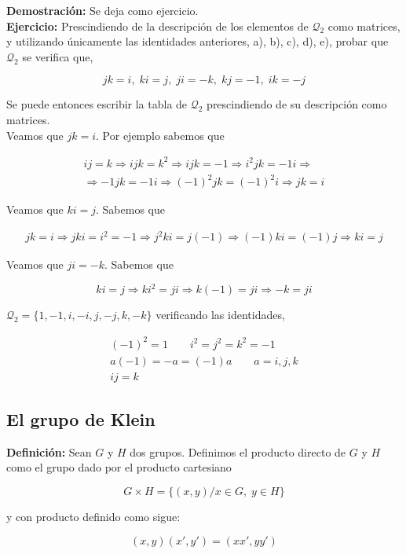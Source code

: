\documentclass{article}
\begin{document}
\textbf{Demostración:} Se deja como ejercicio. \\

\textbf{Ejercicio:} Prescindiendo de la descripción de los elementos de $\mathcal{Q}_2$ como matrices, y utilizando únicamente las identidades anteriores, a), b), c), d), e), probar que $\mathcal{Q}_2$ se verifica que,

\[
jk=i,\; ki=j,\; ji=-k,\; kj=-1,\; ik=-j
\]

Se puede entonces escribir la tabla de $\mathcal{Q}_2$ prescindiendo de su descripción como matrices. \\

Veamos que $jk=i$. Por ejemplo sabemos que

\begin{gather*}
ij=k\Rightarrow ijk=k^2\Rightarrow ijk=-1 \Rightarrow i^2jk=-1i \Rightarrow \\
\Rightarrow -1jk=-1i \Rightarrow (-1)^2jk=(-1)^2i \Rightarrow jk=i
\end{gather*}

Veamos que $ki=j$. Sabemos que 

\begin{gather*}
jk=i \Rightarrow jki=i^2=-1 \Rightarrow j^2ki=j(-1) \Rightarrow (-1)ki=(-1)j \Rightarrow ki=j
\end{gather*}

Veamos que $ji=-k$. Sabemos que 

\[
ki=j \Rightarrow ki^2=ji \Rightarrow k(-1)=ji \Rightarrow -k=ji
\]

$\mathcal{Q}_2=\{1,-1,i,-i,j,-j,k,-k\}$ verificando las identidades,

\begin{gather*}
(-1)^2=1 \qquad i^2=j^2=k^2=-1 \\
a(-1)=-a=(-1)a \qquad a=i,j,k \\
ij=k
\end{gather*}

\subsection{El grupo de Klein}

\textbf{Definición:} Sean $G$ y $H$ dos grupos. Definimos el producto directo de $G$ y $H$ como el grupo dado por el producto cartesiano

\[
G\times H=\{(x,y)/x \in G,\; y\in H\}
\]

y con producto definido como sigue:

\[
(x,y)(x',y')=(xx',yy')
\]
\end{document}
